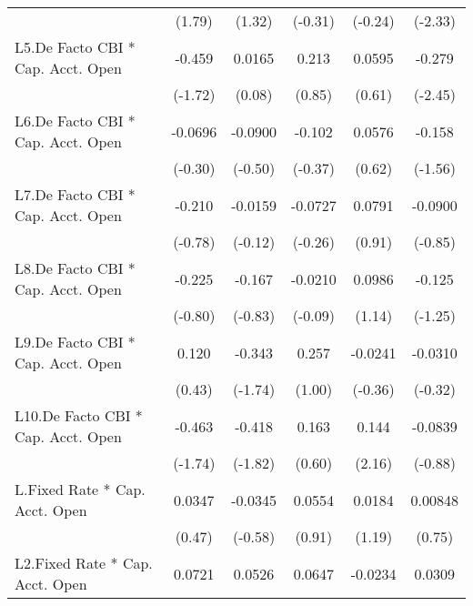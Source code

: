 {\begin{longtable}{l*{5}{c}}
                &   (1.79)         &   (1.32)         &  (-0.31)         &  (-0.24)         &  (-2.33)         \\
[1em]
L5.De Facto CBI * Cap. Acct. Open&   -0.459         &   0.0165         &    0.213         &   0.0595         &   -0.279\sym{*}  \\
                &  (-1.72)         &   (0.08)         &   (0.85)         &   (0.61)         &  (-2.45)         \\
[1em]
L6.De Facto CBI * Cap. Acct. Open&  -0.0696         &  -0.0900         &   -0.102         &   0.0576         &   -0.158         \\
                &  (-0.30)         &  (-0.50)         &  (-0.37)         &   (0.62)         &  (-1.56)         \\
[1em]
L7.De Facto CBI * Cap. Acct. Open&   -0.210         &  -0.0159         &  -0.0727         &   0.0791         &  -0.0900         \\
                &  (-0.78)         &  (-0.12)         &  (-0.26)         &   (0.91)         &  (-0.85)         \\
[1em]
L8.De Facto CBI * Cap. Acct. Open&   -0.225         &   -0.167         &  -0.0210         &   0.0986         &   -0.125         \\
                &  (-0.80)         &  (-0.83)         &  (-0.09)         &   (1.14)         &  (-1.25)         \\
[1em]
L9.De Facto CBI * Cap. Acct. Open&    0.120         &   -0.343         &    0.257         &  -0.0241         &  -0.0310         \\
                &   (0.43)         &  (-1.74)         &   (1.00)         &  (-0.36)         &  (-0.32)         \\
[1em]
L10.De Facto CBI * Cap. Acct. Open&   -0.463         &   -0.418         &    0.163         &    0.144\sym{*}  &  -0.0839         \\
                &  (-1.74)         &  (-1.82)         &   (0.60)         &   (2.16)         &  (-0.88)         \\
[1em]
L.Fixed Rate * Cap. Acct. Open&   0.0347         &  -0.0345         &   0.0554         &   0.0184         &  0.00848         \\
                &   (0.47)         &  (-0.58)         &   (0.91)         &   (1.19)         &   (0.75)         \\
[1em]
L2.Fixed Rate * Cap. Acct. Open&   0.0721         &   0.0526         &   0.0647         &  -0.0234         &   0.0309\sym{*}  \\

\end{longtable}}
